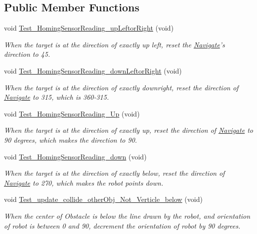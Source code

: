 \subsection*{Public Member Functions}
\begin{DoxyCompactItemize}
\item 
void \hyperlink{classEnvironmentClassTest_aea6f1c71d57ae40bf3fc7d096cf561a8}{Test\-\_\-\-Homing\-Sensor\-Reading\-\_\-up\-Leftor\-Right} (void)
\begin{DoxyCompactList}\small\item\em When the target is at the direction of exactly up left, reset the \hyperlink{structNavigate}{Navigate}'s direction to 45. \end{DoxyCompactList}\item 
void \hyperlink{classEnvironmentClassTest_a80efcd90295b95510ffe4b966e905a9e}{Test\-\_\-\-Homing\-Sensor\-Reading\-\_\-down\-Leftor\-Right} (void)
\begin{DoxyCompactList}\small\item\em When the target is at the direction of exactly downright, reset the direction of \hyperlink{structNavigate}{Navigate} to 315, which is 360-\/315. \end{DoxyCompactList}\item 
void \hyperlink{classEnvironmentClassTest_a888d1566d66aafb04146c8eb3ef67084}{Test\-\_\-\-Homing\-Sensor\-Reading\-\_\-\-Up} (void)
\begin{DoxyCompactList}\small\item\em When the target is at the direction of exactly up, reset the direction of \hyperlink{structNavigate}{Navigate} to 90 degrees, which makes the direction to 90. \end{DoxyCompactList}\item 
void \hyperlink{classEnvironmentClassTest_ad775e188eeabf3f42cded2a7c12c1320}{Test\-\_\-\-Homing\-Sensor\-Reading\-\_\-down} (void)
\begin{DoxyCompactList}\small\item\em When the target is at the direction of exactly below, reset the direction of \hyperlink{structNavigate}{Navigate} to 270, which makes the robot points down. \end{DoxyCompactList}\item 
void \hyperlink{classEnvironmentClassTest_a4b2bed563687924d81ee47326e209ff5}{Test\-\_\-update\-\_\-collide\-\_\-other\-Obj\-\_\-\-Not\-\_\-\-Verticle\-\_\-below} (void)
\begin{DoxyCompactList}\small\item\em When the center of Obstacle is below the line drawn by the robot, and orientation of robot is between 0 and 90, decrement the orientation of robot by 90 degrees. \end{DoxyCompactList}\item 

\end{DoxyCompactItemize}
